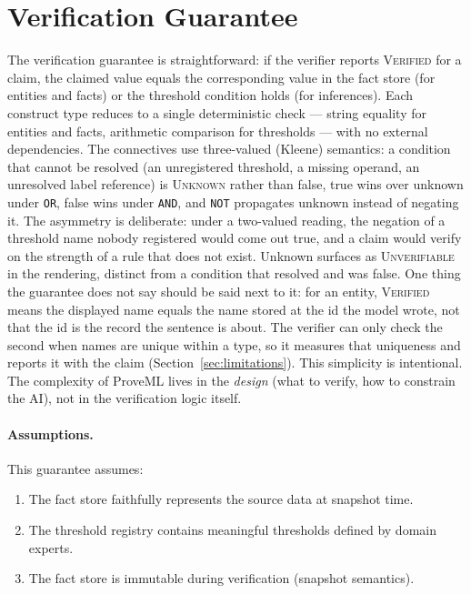 \documentclass[11pt,a4paper]{article}
\begin{document}
\section{Verification Guarantee}
\label{sec:guarantee}

The verification guarantee is straightforward: if the verifier reports \textsc{Verified} for a claim, the claimed value equals the corresponding value in the fact store (for entities and facts) or the threshold condition holds (for inferences). Each construct type reduces to a single deterministic check --- string equality for entities and facts, arithmetic comparison for thresholds --- with no external dependencies. The connectives use three-valued (Kleene) semantics: a condition that cannot be resolved (an unregistered threshold, a missing operand, an unresolved label reference) is \textsc{Unknown} rather than false, true wins over unknown under \texttt{OR}, false wins under \texttt{AND}, and \texttt{NOT} propagates unknown instead of negating it. The asymmetry is deliberate: under a two-valued reading, the negation of a threshold name nobody registered would come out true, and a claim would verify on the strength of a rule that does not exist. Unknown surfaces as \textsc{Unverifiable} in the rendering, distinct from a condition that resolved and was false. One thing the guarantee does not say should be said next to it: for an entity, \textsc{Verified} means the displayed name equals the name stored at the id the model wrote, not that the id is the record the sentence is about. The verifier can only check the second when names are unique within a type, so it measures that uniqueness and reports it with the claim (Section~\ref{sec:limitations}). This simplicity is intentional. The complexity of ProveML lives in the \textit{design} (what to verify, how to constrain the AI), not in the verification logic itself.

\paragraph{Assumptions.}
This guarantee assumes:
\begin{enumerate}
    \item The fact store faithfully represents the source data at snapshot time.
    \item The threshold registry contains meaningful thresholds defined by domain experts.
    \item The fact store is immutable during verification (snapshot semantics).
\end{enumerate}
\end{document}
